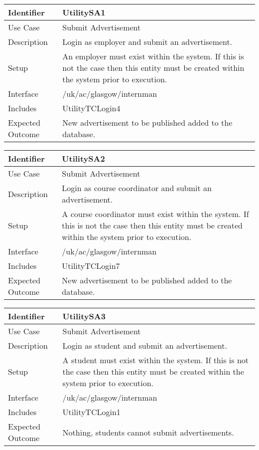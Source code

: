 \vspace{2em}


\begin{tabularx}{\textwidth}{|T|L|}
\hline
Identifier & UtilitySA1\\
\hline
Use Case & Submit Advertisement \\
Description & Login as employer and submit an advertisement.\\
\hline
Setup & An employer must exist within the system. If this is not the
case then this entity must be created within the system prior to execution. \\
\hline
Interface & /uk/ac/glasgow/internman \\
\hline
Includes & UtilityTCLogin4 \\
\hline
Expected Outcome & New advertisement to be published added to the database.\\
\hline
\end{tabularx}

\vspace{2em}

\begin{tabularx}{\textwidth}{|T|L|}
\hline
Identifier & UtilitySA2\\
\hline
Use Case & Submit Advertisement \\
Description & Login as course coordinator and submit an advertisement.\\
\hline
Setup & A course coordinator must exist within the system. If this is
not the case then this entity must be created within the system prior
to execution.  \\
\hline
Interface & /uk/ac/glasgow/internman \\
\hline
Includes & UtilityTCLogin7 \\
\hline
Expected Outcome & New advertisement to be published added to the database.\\
\hline
\end{tabularx}

\vspace{2em}

\begin{tabularx}{\textwidth}{|T|L|}
\hline
Identifier & UtilitySA3\\
\hline
Use Case & Submit Advertisement \\
\hline
Description & Login as student and submit an advertisement.\\
\hline
Setup & A student must exist within the system. If this is not the
case then this entity must be created within the system prior to execution.\\
\hline
Interface & /uk/ac/glasgow/internman \\
\hline
Includes & UtilityTCLogin1 \\
\hline
Expected Outcome & Nothing, students cannot submit advertisements.\\
\hline
\end{tabularx}

